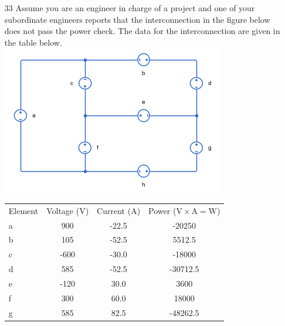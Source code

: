 \documentclass[a4paper]{article}
\begin{document}
\begin{itemize}
\begin{itemize}
\begin{tabular}{r c l}
	      	      \end{tabular} 
	      \end{itemize}
	\item[33] Assume you are an engineer in charge of a project and one of your subordinate engineers reports that the interconnection in the figure below does not pass the power check. The data for the interconnection are given in the table below. \\
	      \includegraphics{P1-33.png} \\
	      \begin{tabular}{l c c c}
	      	Element & Voltage (\si{\volt}) & Current (\si{\ampere}) & Power ($\si{\volt}\times\si{\ampere} = \si{\watt}$) \\
	      	a       & 900                  & -22.5                  & -20250                                              \\
	      	b       & 105                  & -52.5                  & 5512.5                                              \\
	      	c       & -600                 & -30.0                  & -18000                                              \\
	      	d       & 585                  & -52.5                  & -30712.5                                            \\
	      	e       & -120                 & 30.0                   & 3600                                                \\
	      	f       & 300                  & 60.0                   & 18000                                               \\
	      	g       & 585                  & 82.5                   & -48262.5                                            \\

\end{tabular}
\end{itemize}
\end{document}
